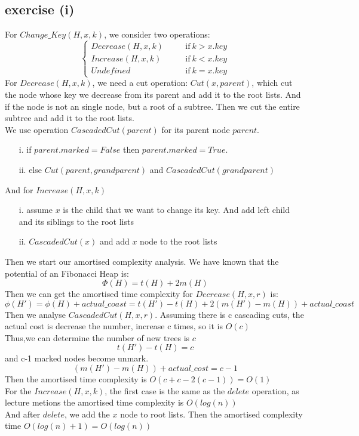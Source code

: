\documentclass[12pt,oneside,a4paper]{article}
\begin{document}
\subsection{exercise (i)}
For $Change\_Key(H,x,k)$, we consider two operations:
$$\left\{
\begin{aligned}
Decrease(H,x,k)&\quad&\text{if}~k > x.key\\
Increase(H,x,k)&\quad&\text{if}~k < x.key\\
Undefined&\quad&\text{if}~k = x.key
\end{aligned}
\right.
$$
For $Decrease(H,x,k)$, we need a cut operation: $Cut(x,parent)$, which cut the node whose key we decrease from its parent and add it to the root lists. And if the node is not an single node, but a root of a subtree. Then we cut the entire subtree and add it to the root lists.\\
We use operation $CascadedCut(parent)$ for its parent node $parent$.\\
\begin{itemize}
    \item[i.]   if $parent.marked = False$ then $parent.marked=True$.
    \item[ii.]  else $Cut(parent,grandparent)$ and $CascadedCut(grandparent)$
\end{itemize}
And for $Increase(H,x,k)$
\begin{itemize}
    \item[i.]   assume $x$ is the child that we want to change its key. And add left child and its siblings to the root lists 
    \item[ii.]  $CascadedCut(x)$ and add $x$ node to the root lists
\end{itemize}
Then we start our amortised complexity analysis. We have known that the potential of an Fibonacci Heap is:
$$
\Phi(H)=t(H)+2m(H) 
$$
Then we can get the amortised time complexity for $Decrease(H,x,r)$ is:
$$
\phi(H')=\phi(H)+actual\_coast=t(H')-t(H)+2(m(H')-m(H))+actual\_coast
$$
Then we analyse $CascadedCut(H,x,r)$. Assuming there is c cascading cuts, the actual cost is decrease the number, increase c times, so it is $O(c)$\\
Thus,we can determine the number of new trees is $c$
$$
t(H')-t(H)=c
$$ 
and c-1 marked nodes become unmark.
$$
(m(H')-m(H))+actual\_cost = c-1
$$
Then the amortised time complexity is $O(c+c-2(c-1))=O(1)$\\
For the $Increase(H,x,k)$, the first case is the same as the $delete$ operation, as lecture metions the amortised time complexity is $O(log(n))$\\
And after $delete$, we add the $x$ node to root lists. Then the amortised complexity time $O(log(n)+1)=O(log(n))$  
\end{document}

